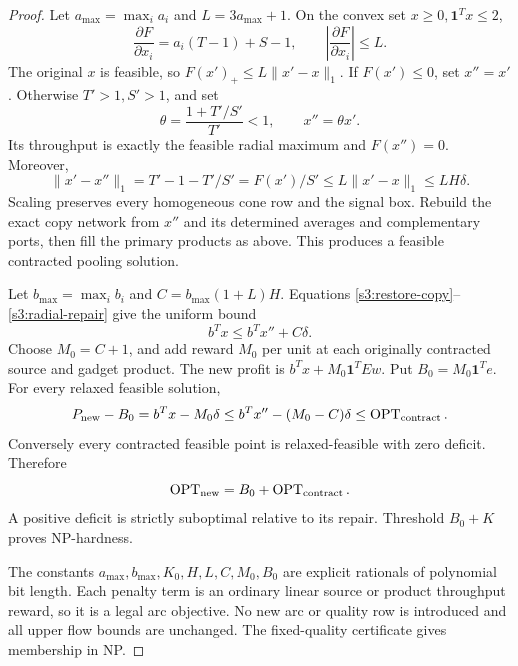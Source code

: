 \begin{proof}
Let $a_{\max}=\max_i a_i$ and $L=3a_{\max}+1$. On the convex set
$x\ge0,\mathbf1^Tx\le2$,
\[
 \frac{\partial F}{\partial x_i}=a_i(T-1)+S-1,
 \qquad \left|\frac{\partial F}{\partial x_i}\right|\le L.
\]
The original $x$ is feasible, so $F(x')_+\le L\|x'-x\|_1$.
If $F(x')\le0$, set $x''=x'$. Otherwise $T'>1,S'>1$, and set
\[
 \theta=\frac{1+T'/S'}{T'}<1,\qquad x''=\theta x'.
\]
Its throughput is exactly the feasible radial maximum and $F(x'')=0$.
Moreover,
\begin{equation}
 \|x'-x''\|_1=T'-1-T'/S'=F(x')/S'
 \le L\|x'-x\|_1\le LH\delta.\label{s3:radial-repair}
\end{equation}
Scaling preserves every homogeneous cone row and the signal box.
Rebuild the exact copy network from $x''$ and its determined averages
and complementary ports, then fill the primary products as above.
This produces a feasible contracted pooling solution.

Let $b_{\max}=\max_i b_i$ and $C=b_{\max}(1+L)H$. Equations
\eqref{s3:restore-copy}--\eqref{s3:radial-repair} give the uniform bound
\begin{equation}
 b^Tx\le b^Tx''+C\delta.\label{s3:profit-repair}
\end{equation}
Choose $M_0=C+1$, and add reward $M_0$ per unit at each originally
contracted source and gadget product. The new profit is
$b^Tx+M_0\mathbf1^TEw$. Put $B_0=M_0\mathbf1^Te$.
For every relaxed feasible solution,
\[
 P_{\rm new}-B_0=b^Tx-M_0\delta
 \le b^Tx''-(M_0-C)\delta\le\operatorname{OPT}_{\rm contract}.
\]
Conversely every contracted feasible point is relaxed-feasible with
zero deficit. Therefore
\begin{equation}
 \operatorname{OPT}_{\rm new}=B_0+\operatorname{OPT}_{\rm contract}.\label{s3:penalty-value}
\end{equation}
A positive deficit is strictly suboptimal relative to its repair.
Threshold $B_0+K$ proves NP-hardness.

The constants $a_{\max},b_{\max},K_0,H,L,C,M_0,B_0$ are explicit
rationals of polynomial bit length. Each penalty term is an ordinary
linear source or product throughput reward, so it is a legal arc
objective. No new arc or quality row is introduced and all upper flow
bounds are unchanged. The fixed-quality certificate gives membership
in NP.


\end{proof}
